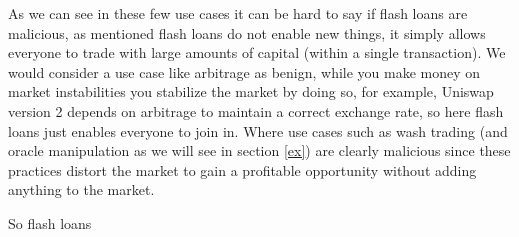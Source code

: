 As we can see in these few use cases it can be hard to say if flash
loans are malicious, as mentioned flash loans do not enable new
things, it simply allows everyone to trade with large amounts of
capital (within a single transaction). We would consider a use case
like arbitrage as benign, while you make money on market instabilities
you stabilize the market by doing so, for example, Uniswap version 2
depends on arbitrage to maintain a correct exchange rate, so here
flash loans just enables everyone to join in. Where use cases such as
wash trading (and oracle manipulation as we will see in section
\ref{ex}) are clearly malicious since these practices distort the
market to gain a profitable opportunity without adding anything to the
market.

So flash loans
